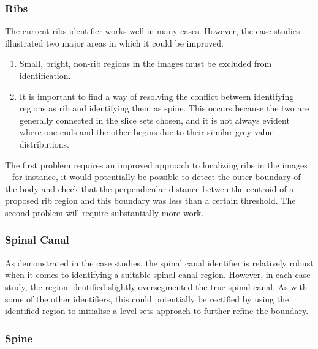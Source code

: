 \subsubsection{Ribs}

The current ribs identifier works well in many cases. However, the case studies illustrated two major areas in which it could be improved:
%
\begin{enumerate}

\item Small, bright, non-rib regions in the images must be excluded from identification.
\item It is important to find a way of resolving the conflict between identifying regions as rib and identifying them as spine. This occurs because the two are generally connected in the slice sets chosen, and it is not always evident where one ends and the other begins due to their similar grey value distributions.

\end{enumerate}
%
The first problem requires an improved approach to localizing ribs in the images -- for instance, it would potentially be possible to detect the outer boundary of the body and check that the perpendicular distance betwen the centroid of a proposed rib region and this boundary was less than a certain threshold. The second problem will require substantially more work.

\subsubsection{Spinal Canal}

As demonstrated in the case studies, the spinal canal identifier is relatively robust when it comes to identifying a suitable spinal canal region. However, in each case study, the region identified slightly oversegmented the true spinal canal. As with some of the other identifiers, this could potentially be rectified by using the identified region to initialise a level sets approach to further refine the boundary.

\subsubsection{Spine}

